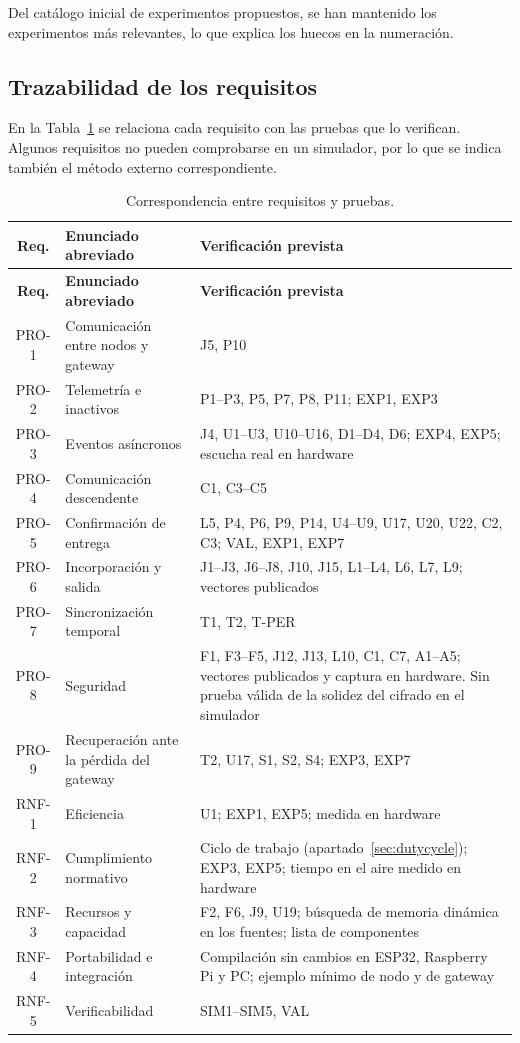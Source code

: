 Del catálogo inicial de experimentos propuestos, se han mantenido los experimentos más relevantes, lo que explica los huecos en la numeración.


\subsection{Trazabilidad de los requisitos}\label{sec:trazabilidad}

En la Tabla~\ref{tab:trazabilidad} se relaciona cada requisito con las pruebas que lo verifican. Algunos requisitos no pueden comprobarse en un simulador, por lo que se indica también el método externo correspondiente.

{\small
\begin{longtable}{|c|p{4.4cm}|p{8.2cm}|}
\caption{\label{tab:trazabilidad} Correspondencia entre requisitos y pruebas.}\\
\hline
\textbf{Req.} & \textbf{Enunciado abreviado} & \textbf{Verificación prevista} \\
\hline
\endfirsthead
\hline
\textbf{Req.} & \textbf{Enunciado abreviado} & \textbf{Verificación prevista} \\
\hline
\endhead
PRO-1 & Comunicación entre nodos y gateway & J5, P10 \\
\hline
PRO-2 & Telemetría e inactivos & P1--P3, P5, P7, P8, P11; EXP1, EXP3 \\
\hline
PRO-3 & Eventos asíncronos & J4, U1--U3, U10--U16, D1--D4, D6; EXP4, EXP5; escucha real en hardware \\
\hline
PRO-4 & Comunicación descendente & C1, C3--C5 \\
\hline
PRO-5 & Confirmación de entrega & L5, P4, P6, P9, P14, U4--U9, U17, U20, U22, C2, C3; VAL, EXP1, EXP7 \\
\hline
PRO-6 & Incorporación y salida & J1--J3, J6--J8, J10, J15, L1--L4, L6, L7, L9; vectores publicados \\
\hline
PRO-7 & Sincronización temporal & T1, T2, T-PER \\
\hline
PRO-8 & Seguridad & F1, F3--F5, J12, J13, L10, C1, C7, A1--A5; vectores publicados y captura en hardware. Sin prueba válida de la solidez del cifrado en el simulador \\
\hline
PRO-9 & Recuperación ante la pérdida del gateway & T2, U17, S1, S2, S4; EXP3, EXP7 \\
\hline
RNF-1 & Eficiencia & U1; EXP1, EXP5; medida en hardware \\
\hline
RNF-2 & Cumplimiento normativo & Ciclo de trabajo (apartado~\ref{sec:dutycycle}); EXP3, EXP5; tiempo en el aire medido en hardware \\
\hline
RNF-3 & Recursos y capacidad & F2, F6, J9, U19; búsqueda de memoria dinámica en los fuentes; lista de componentes \\
\hline
RNF-4 & Portabilidad e integración & Compilación sin cambios en ESP32, Raspberry Pi y PC; ejemplo mínimo de nodo y de gateway \\
\hline
RNF-5 & Verificabilidad & SIM1--SIM5, VAL \\
\hline
\end{longtable}
}


